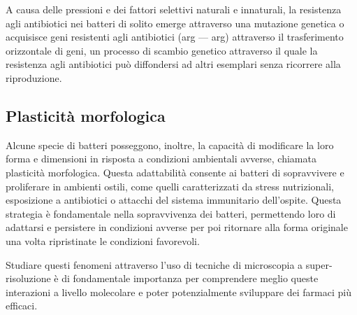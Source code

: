 \documentclass[../main.tex]{subfiles}
\begin{document}
A causa delle pressioni e dei fattori selettivi naturali e innaturali, la resistenza agli antibiotici nei batteri di solito emerge attraverso una mutazione genetica o acquisisce geni resistenti agli antibiotici (\acrlong{arg} --- \acrshort{arg}) attraverso il trasferimento orizzontale di geni, un processo di scambio genetico attraverso il quale la resistenza agli antibiotici può diffondersi ad altri esemplari senza ricorrere alla riproduzione.\cite{madigan_2015}

\subsection{Plasticità morfologica}

Alcune specie di batteri posseggono, inoltre, la capacità di modificare la loro forma e dimensioni in risposta a condizioni ambientali avverse, chiamata plasticità morfologica. Questa adattabilità consente ai batteri di sopravvivere e proliferare in ambienti ostili, come quelli caratterizzati da stress nutrizionali, esposizione a antibiotici o attacchi del sistema immunitario dell'ospite. Questa strategia è fondamentale nella sopravvivenza dei batteri, permettendo loro di adattarsi e persistere in condizioni avverse per poi ritornare alla forma originale una volta ripristinate le condizioni favorevoli.\cite{justice_2008}\bigskip

\noindent Studiare questi fenomeni attraverso l'uso di tecniche di microscopia a super-risoluzione è di fondamentale importanza per comprendere meglio queste interazioni a livello molecolare e poter potenzialmente sviluppare dei farmaci più efficaci.
\end{document}

